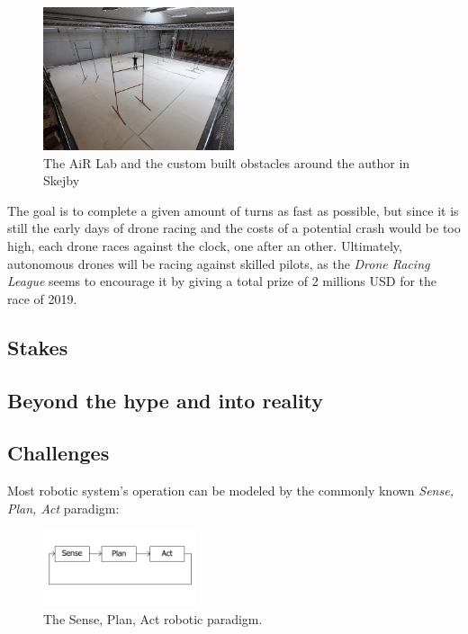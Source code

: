 \begin{figure}[h]
	\centering
	\includegraphics[width=0.5\textwidth]{figure/tiny_me.jpg}
	\caption{The AiR Lab and the custom built obstacles around the author in Skejby}
	\label{fig:mygates}
\end{figure}

The goal is to complete a given amount of turns as fast as possible, but since
it is still the early days of drone racing and the costs of a potential crash
would be too high, each drone races against the clock, one after an other.
Ultimately, autonomous drones will be racing against skilled pilots, as the
\emph{Drone Racing League} seems to encourage it by giving a total prize of 2
millions USD for the race of 2019.


\subsection{Stakes}


\subsection{Beyond the hype and into reality}


\subsection{Challenges}
Most robotic system's operation can be modeled by the commonly known
\emph{Sense, Plan, Act} paradigm:
\begin{figure}[h]
	\centering
	\includegraphics[width=0.4\textwidth]{figure/robotic_paradigm.png}
	\caption{The Sense, Plan, Act robotic paradigm.}
	\label{fig:robotic_paradigm}
\end{figure}

